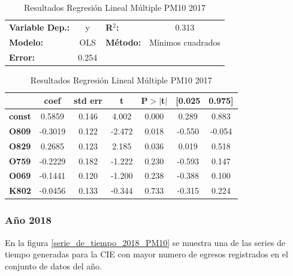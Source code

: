 \begin{table}[hbt!]
\caption{Resultados Regresión Lineal Múltiple PM10 2017}
\label{tab:RRLM PM10 2017}
\begin{center}
\begin{tabular}{lclc}
\toprule
\textbf{Variable Dep.:}    &        y         & \textbf{  R$^2$:         } &     0.313   \\
\textbf{Modelo:}            &       OLS        & \textbf{Método:}           &  Mínimos cuadrados  \\
\textbf{Error:}            & 0.254  \\
\bottomrule
\end{tabular}
\begin{tabular}{lcccccc}
               & \textbf{coef} & \textbf{std err} & \textbf{t} & \textbf{P$> |$t$|$} & \textbf{[0.025} & \textbf{0.975]}  \\
\midrule
\textbf{const} &       0.5859  &        0.146     &     4.002  &         0.000        &        0.289    &        0.883     \\
\textbf{O809}  &      -0.3019  &        0.122     &    -2.472  &         0.018        &       -0.550    &       -0.054     \\
\textbf{O829}  &       0.2685  &        0.123     &     2.185  &         0.036        &        0.019    &        0.518     \\
\textbf{O759}  &      -0.2229  &        0.182     &    -1.222  &         0.230        &       -0.593    &        0.147     \\
\textbf{O069}  &      -0.1441  &        0.120     &    -1.200  &         0.238        &       -0.388    &        0.100     \\
\textbf{K802}  &      -0.0456  &        0.133     &    -0.344  &         0.733        &       -0.315    &        0.224     \\
\bottomrule
\end{tabular}
\end{center}
\end{table}

\clearpage
\subsubsection{Año 2018}
En la figura \ref{serie_de_tiempo_2018_PM10} se muestra una de las series de tiempo generadas para la CIE \citep{r9} con mayor numero de egresos registrados en el conjunto de datos del año.

